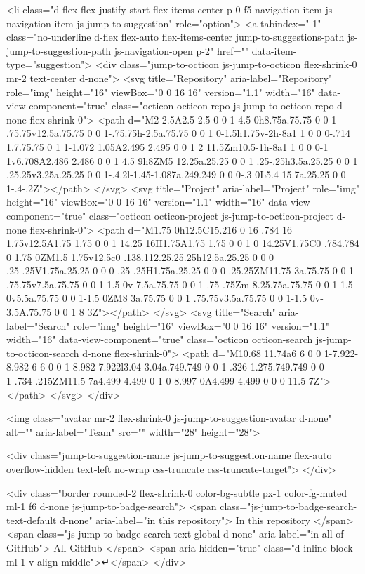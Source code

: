 <li class="d-flex flex-justify-start flex-items-center p-0 f5 navigation-item js-navigation-item js-jump-to-suggestion" role="option">
  <a tabindex="-1" class="no-underline d-flex flex-auto flex-items-center jump-to-suggestions-path js-jump-to-suggestion-path js-navigation-open p-2" href="" data-item-type="suggestion">
    <div class="jump-to-octicon js-jump-to-octicon flex-shrink-0 mr-2 text-center d-none">
      <svg title="Repository" aria-label="Repository" role="img" height="16" viewBox="0 0 16 16" version="1.1" width="16" data-view-component="true" class="octicon octicon-repo js-jump-to-octicon-repo d-none flex-shrink-0">
    <path d="M2 2.5A2.5 2.5 0 0 1 4.5 0h8.75a.75.75 0 0 1 .75.75v12.5a.75.75 0 0 1-.75.75h-2.5a.75.75 0 0 1 0-1.5h1.75v-2h-8a1 1 0 0 0-.714 1.7.75.75 0 1 1-1.072 1.05A2.495 2.495 0 0 1 2 11.5Zm10.5-1h-8a1 1 0 0 0-1 1v6.708A2.486 2.486 0 0 1 4.5 9h8ZM5 12.25a.25.25 0 0 1 .25-.25h3.5a.25.25 0 0 1 .25.25v3.25a.25.25 0 0 1-.4.2l-1.45-1.087a.249.249 0 0 0-.3 0L5.4 15.7a.25.25 0 0 1-.4-.2Z"></path>
</svg>
      <svg title="Project" aria-label="Project" role="img" height="16" viewBox="0 0 16 16" version="1.1" width="16" data-view-component="true" class="octicon octicon-project js-jump-to-octicon-project d-none flex-shrink-0">
    <path d="M1.75 0h12.5C15.216 0 16 .784 16 1.75v12.5A1.75 1.75 0 0 1 14.25 16H1.75A1.75 1.75 0 0 1 0 14.25V1.75C0 .784.784 0 1.75 0ZM1.5 1.75v12.5c0 .138.112.25.25.25h12.5a.25.25 0 0 0 .25-.25V1.75a.25.25 0 0 0-.25-.25H1.75a.25.25 0 0 0-.25.25ZM11.75 3a.75.75 0 0 1 .75.75v7.5a.75.75 0 0 1-1.5 0v-7.5a.75.75 0 0 1 .75-.75Zm-8.25.75a.75.75 0 0 1 1.5 0v5.5a.75.75 0 0 1-1.5 0ZM8 3a.75.75 0 0 1 .75.75v3.5a.75.75 0 0 1-1.5 0v-3.5A.75.75 0 0 1 8 3Z"></path>
</svg>
      <svg title="Search" aria-label="Search" role="img" height="16" viewBox="0 0 16 16" version="1.1" width="16" data-view-component="true" class="octicon octicon-search js-jump-to-octicon-search d-none flex-shrink-0">
    <path d="M10.68 11.74a6 6 0 0 1-7.922-8.982 6 6 0 0 1 8.982 7.922l3.04 3.04a.749.749 0 0 1-.326 1.275.749.749 0 0 1-.734-.215ZM11.5 7a4.499 4.499 0 1 0-8.997 0A4.499 4.499 0 0 0 11.5 7Z"></path>
</svg>
    </div>

    <img class="avatar mr-2 flex-shrink-0 js-jump-to-suggestion-avatar d-none" alt="" aria-label="Team" src="" width="28" height="28">

    <div class="jump-to-suggestion-name js-jump-to-suggestion-name flex-auto overflow-hidden text-left no-wrap css-truncate css-truncate-target">
    </div>

    <div class="border rounded-2 flex-shrink-0 color-bg-subtle px-1 color-fg-muted ml-1 f6 d-none js-jump-to-badge-search">
      <span class="js-jump-to-badge-search-text-default d-none" aria-label="in this repository">
        In this repository
      </span>
      <span class="js-jump-to-badge-search-text-global d-none" aria-label="in all of GitHub">
        All GitHub
      </span>
      <span aria-hidden="true" class="d-inline-block ml-1 v-align-middle">↵</span>
    </div>

